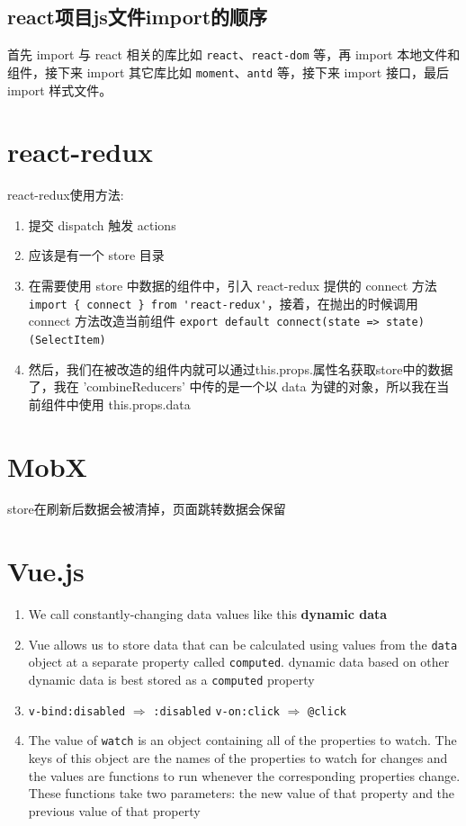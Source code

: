 \documentclass[a4paper, 12pt]{article}
\begin{document}
\subsection{react项目js文件import的顺序}
首先 import 与 react 相关的库比如 \verb|react|、\verb|react-dom| 等，再 import 本地文件和组件，接下来 import 其它库比如 \verb|moment|、\verb|antd| 等，接下来 import 接口，最后 import 样式文件。


\section{react-redux}
react-redux使用方法:
\begin{enumerate}
\item 提交 dispatch 触发 actions

\item 应该是有一个 store 目录

\item 在需要使用 store 中数据的组件中，引入 react-redux 提供的 connect 方法\\ \verb|import { connect } from 'react-redux'|，接着，在抛出的时候调用 connect 方法改造当前组件 \verb|export default connect(state => state)(SelectItem)|

\item 然后，我们在被改造的组件内就可以通过this.props.属性名获取store中的数据了，我在 'combineReducers' 中传的是一个以 data 为键的对象，所以我在当前组件中使用 this.props.data

\end{enumerate}


\section{MobX}
store在刷新后数据会被清掉，页面跳转数据会保留


\section{Vue.js}
\begin{enumerate}
\item We call constantly-changing data values like this \textbf{dynamic data}

\item Vue allows us to store data that can be calculated using values from the \verb|data| object at a separate property called \verb|computed|. dynamic data based on other dynamic data is best stored as a \verb|computed| property

\item \verb|v-bind:disabled| $\Rightarrow$ \verb|:disabled| \quad \verb|v-on:click| $\Rightarrow$ \verb|@click|

\item The value of \verb|watch| is an object containing all of the properties to watch. The keys of this object are the names of the properties to watch for changes and the values are functions to run whenever the corresponding properties change. These functions take two parameters: the new value of that property and the previous value of that property

\end{enumerate}
\end{document}
